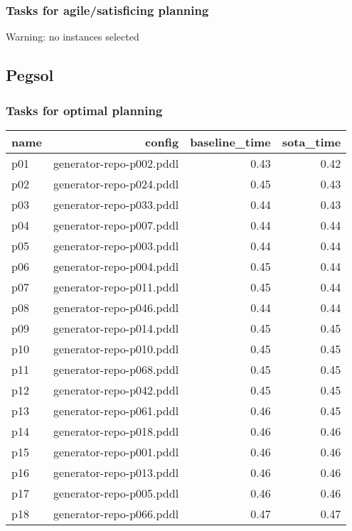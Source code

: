\documentclass{article}
\begin{document}
                    \subsubsection*{Tasks for agile/satisficing planning}
                    Warning: no instances selected
                \newpage \subsection{Pegsol}
                    \subsubsection*{Tasks for optimal planning}
                    
                            \begin{center}
                            \scriptsize
                            \begin{tabular}{@{}l|r|r|r@{}}
                            name & config & baseline\_time & sota\_time\\\midrule
                              p01& generator-repo-p002.pddl&0.43&0.42\\
  p02& generator-repo-p024.pddl&0.45&0.43\\
  p03& generator-repo-p033.pddl&0.44&0.43\\
  p04& generator-repo-p007.pddl&0.44&0.44\\
  p05& generator-repo-p003.pddl&0.44&0.44\\
  p06& generator-repo-p004.pddl&0.45&0.44\\
  p07& generator-repo-p011.pddl&0.45&0.44\\
  p08& generator-repo-p046.pddl&0.44&0.44\\
  p09& generator-repo-p014.pddl&0.45&0.45\\
  p10& generator-repo-p010.pddl&0.45&0.45\\
  p11& generator-repo-p068.pddl&0.45&0.45\\
  p12& generator-repo-p042.pddl&0.45&0.45\\
  p13& generator-repo-p061.pddl&0.46&0.45\\
  p14& generator-repo-p018.pddl&0.46&0.46\\
  p15& generator-repo-p001.pddl&0.46&0.46\\
  p16& generator-repo-p013.pddl&0.46&0.46\\
  p17& generator-repo-p005.pddl&0.46&0.46\\
  p18& generator-repo-p066.pddl&0.47&0.47\\

\end{tabular}
\end{center}
\end{document}
